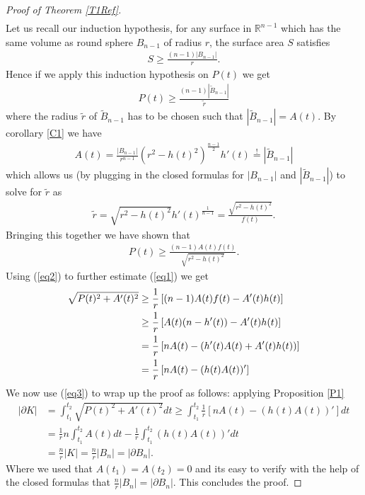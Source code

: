 \documentclass[12pt, a4paper, titlepage]{article}
\begin{document}
\begin{proof}[Proof of Theorem \ref{T1Ref}]
\begin{align}
\end{align}
Let us recall our induction hypothesis, for any surface in $\mathbb{R}^{n-1}$ which has the same volume as round sphere $B_{n-1}$ of radius $r$, the surface area $S$ satisfies 
\begin{align*}
S \geq \frac{(n-1)|B_{n-1}|}{r}.
\end{align*}
Hence if we apply this induction hypothesis on $P(t)$ we get 
\begin{align*}
P(t) \geq \frac{(n-1) |\widetilde{B}_{n-1}|}{\widetilde{r}}
\end{align*}
where the radius $\widetilde{r}$ of $\widetilde{B}_{n-1}$ has to be chosen such that $|\widetilde{B}_{n-1}| = A(t)$. By corollary \ref{C1} we have  
\begin{align*}
A(t)  = \frac{|B_{n-1}|}{r^{n-1}} (r^2-h(t)^2)^\frac{n-1}{2} h'(t) \overset{!}= |\widetilde{B}_{n-1}| 
\end{align*}
which allows us (by plugging in the closed formulas for $|B_{n-1}|$ and $|\widetilde{B}_{n-1}|$) to solve for $\widetilde{r}$ as
\begin{align*}
\widetilde{r} = \sqrt{r^2-h(t)^2}h'(t)^\frac{1}{n-1} = \frac{\sqrt{r^2-h(t)^2}}{f(t)}.
\end{align*}
Bringing this together we have shown that 
\begin{align}
P(t) \geq \frac{(n-1)A(t)f(t)}{\sqrt{r^2-h(t)^2}}. \label{eq2}
\end{align}
Using (\ref{eq2}) to further estimate (\ref{eq1}) we get 
\begin{align} \label{eq3}
\sqrt{P(t)^2 +A'(t)^2} &\geq  \frac{1}{r} \left[ (n-1)A(t)f(t) - A'(t)h(t) \right] \notag \\
& \geq \frac{1}{r}\left[ A(t)(n-h'(t))- A'(t)h(t) \right] \notag \\
&= \frac{1}{r} \left[ nA(t)- (h'(t)A(t)+A'(t)h(t)) \right] \notag \\
&= \frac{1}{r} \left[ nA(t) - (h(t)A(t))'\right]
\end{align}
\newpage
We now use (\ref{eq3}) to wrap up the proof as follows: applying Proposition \ref{P1}
\begin{align*}
| \partial K| &= \int_{t_1}^{t_2} \sqrt{P(t)^2+A'(t)^2}dt \geq \int_{t_1}^{t_2} \frac{1}{r}[nA(t)-(h(t)A(t))' ] dt \\
&= \frac{1}{r}n \int_{t_1}^{t_2} A(t)dt - \frac{1}{r} \int_{t_1}^{t_2} (h(t)A(t))'dt  \\
&= \frac{n}{r} |K| = \frac{n}{r}|B_n| = | \partial B_n|.
\end{align*}
Where we used that $A(t_1)=A(t_2)=0$ and its easy to verify with the help of the closed formulas that $\frac{n}{r}|B_n|= | \partial B_n|$. This concludes the proof. 
\end{proof}
\end{document}
